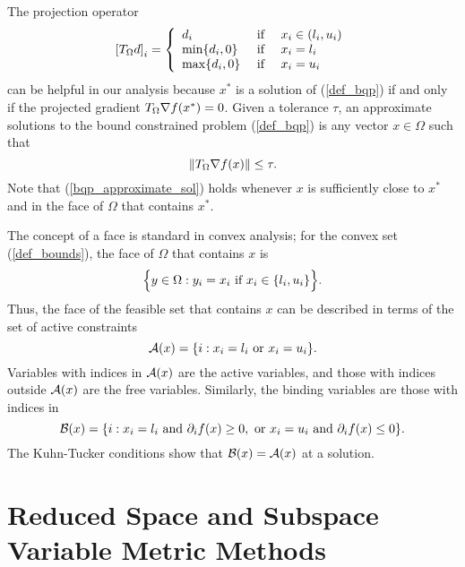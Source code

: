 The projection operator 
\begin{equation} \label{projection-tangent}
 \left[ T_{\Omega} d \right] _i = \left\{
\begin{array}{lll}
d_i & \mbox{ if } & x_i \in (l_i, u_i) \\
\min \{ d_i,0 \} & \mbox{ if } & x_i = l_i \\
\max \{ d_i,0 \} & \mbox{ if } & x_i = u_i
\end{array}
\right.
\end{equation}
can be helpful in our analysis
because $x^*$ is a solution of (\ref{def_bqp}) if and only if
the projected gradient $T_{\Omega} \nabla f(x^*) =0$.
Given a tolerance $\tau$, an
approximate solutions to the bound constrained problem (\ref{def_bqp}) 
is any vector $x \in \Omega$ such
that
\begin{equation} 
\label{bqp_approximate_sol}
\| \tc \nabla f(x) \| \leq \tau . %
\end{equation}
Note that (\ref{bqp_approximate_sol}) holds whenever
$x$ is sufficiently close to $x^*$ and in the face of $\Omega $ that
contains $x^*$.  

The concept of a face is standard in convex analysis;
for the convex set (\ref{def_bounds}), the face of $\Omega$ that contains
$x$ is
\[ 
\Bigl \{ y \in \Omega: y_i = x_i \mbox{ if } x_i \in \{ l_i, u_i \} \Bigr \}. 
\]
Thus, the face of the feasible set that contains $x$ can
be described in terms of the set of active constraints
\[
\mbox{$\cal A$} (x) = \{ i: x_i = l_i \mbox{ or } x_i = u_i \}. 
\]
Variables with indices in ${\cal A}(x)$ are the active variables,
and those with indices outside  ${\cal A}(x)$ are the free variables.
Similarly, the binding variables are those with indices in
\[ 
\mbox{$\cal B$} (x) = \{ i:x_i=l_i \mbox{ and } \partial_if(x) \geq 0,
\mbox{ or } x_i=u_i \mbox{ and } \partial_if(x) \leq 0 \}. 
\]
The Kuhn-Tucker conditions show that 
$ \mbox{$\cal B$} (x) = \mbox{$\cal A$} (x) $ at a solution.


\section{Reduced Space and Subspace Variable Metric Methods}\label{alg}

